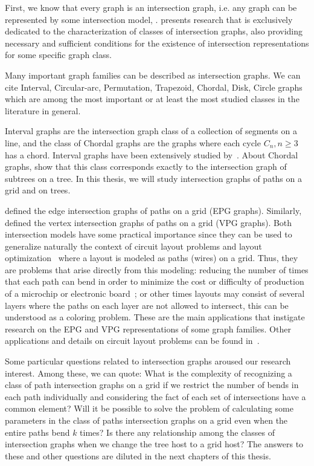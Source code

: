  First, we know that every graph is an intersection graph, i.e. any graph can be represented by some intersection model, \cite{szpilrajn1945translation, erdos1966representation}. \citet{scheinerman1985characterizing} presents  research that is exclusively dedicated to the characterization of classes of intersection graphs, also providing necessary and sufficient conditions for the existence of intersection representations for some specific graph class.


Many important graph families can be described as intersection graphs. We can cite Interval, Circular-arc, Permutation, Trapezoid, Chordal,
Disk, Circle graphs which are among the most important or at least the most studied classes in the literature in general. 

Interval graphs are the intersection graph class of a collection of segments on a line, and the class of Chordal graphs are the graphs where each cycle $C_n, n\geq 3$ has a chord. Interval graphs have been extensively studied by~\cite{lekkeikerker1962representation}. About Chordal graphs, \citet{gavril1974intersection} show that this class corresponds exactly to the intersection graph of subtrees on a tree. In this thesis, we will study intersection graphs of paths on a grid and on trees.

\citet{golumbic2009} defined the edge intersection graphs of paths on a grid (EPG graphs). Similarly, \cite{asinowski2011string, asinowski2012} defined the vertex intersection graphs of paths on a grid (VPG graphs).  Both intersection models have some practical importance since they can be used to generalize naturally the context of
circuit layout problems and layout optimization~\cite{sinden1966topology} where a layout is modeled
as paths (wires) on a grid. Thus, they are problems that arise directly from this modeling: reducing the number of times that each path can bend in order to minimize the cost or difficulty of production of a microchip or electronic board~\cite{bandy1990,molitor1991}; or  other times layouts may consist of several layers where the paths on each layer are not allowed to intersect, this can be understood as a coloring problem. These are the main applications that instigate research on the EPG and VPG representations of some graph families. Other applications and details on circuit layout problems can be found in~\cite{bandy1990, molitor1991, sinden1966topology}.

Some particular questions related to intersection graphs aroused our research interest. Among these, we can quote: What is the complexity of recognizing a class of path intersection graphs on a grid if we restrict the number of bends in each path individually and considering the fact of each set of intersections have a common element? Will it be possible to solve the problem of calculating some parameters in the class of paths intersection graphs on a grid  even when the entire paths bend $k$ times? Is there any relationship among the classes of intersection graphs when we change the tree host to a grid host? The answers to these and other questions are diluted in the next chapters of this thesis.


